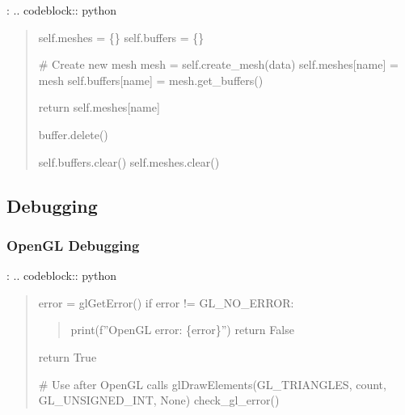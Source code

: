 \documentclass[a4paper,10pt,english,openany,oneside]{sphinxmanual}
\begin{document}
\sphinxAtStartPar
{}:
.. code\sphinxhyphen{}block:: python
\begin{quote}
\begin{description}
\begin{description}
\sphinxAtStartPar
self.meshes = \{\}
self.buffers = \{\}

\begin{description}
\sphinxAtStartPar
\# Create new mesh
mesh = self.create\_mesh(data)
self.meshes{[}name{]} = mesh
self.buffers{[}name{]} = mesh.get\_buffers()

\end{description}

\sphinxAtStartPar
return self.meshes{[}name{]}

\begin{description}
\begin{description}
\sphinxAtStartPar
buffer.delete()

\end{description}

\end{description}

\sphinxAtStartPar
self.buffers.clear()
self.meshes.clear()

\end{description}

\end{description}
\end{quote}


\subsection{Debugging}
\label{\detokenize{development:debugging}}

\subsubsection{OpenGL Debugging}
\label{\detokenize{development:opengl-debugging}}
\sphinxAtStartPar
{}:
.. code\sphinxhyphen{}block:: python
\begin{quote}
\begin{description}
\sphinxAtStartPar
error = glGetError()
if error != GL\_NO\_ERROR:
\begin{quote}

\sphinxAtStartPar
print(f”OpenGL error: \{error\}”)
return False
\end{quote}

\sphinxAtStartPar
return True

\end{description}

\sphinxAtStartPar
\# Use after OpenGL calls
glDrawElements(GL\_TRIANGLES, count, GL\_UNSIGNED\_INT, None)
check\_gl\_error()
\end{quote}
\end{document}
